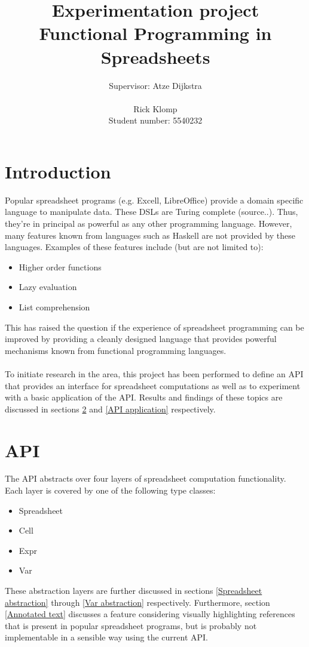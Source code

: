 \documentclass[10pt,a4paper]{article}
\begin{document}
\author{Supervisor: Atze Dijkstra\\\\Rick Klomp\\Student number: 5540232}
\title{Experimentation project\\Functional Programming in Spreadsheets}
\maketitle
\pagebreak

\section{Introduction}
Popular spreadsheet programs (e.g. Excell, LibreOffice) provide a
domain specific language to manipulate data. These DSLs are Turing complete (source..). Thus,
they're in principal as powerful as any other programming language.
However, many features known from languages such as Haskell are not provided by these languages.
Examples of these features include (but are not limited to):
\begin{itemize}
\item Higher order functions
\item Lazy evaluation
\item List comprehension
\end{itemize}
This has raised the question if the experience of spreadsheet programming can be improved by
providing a cleanly designed language that provides powerful mechanisms known from functional
programming languages.
\\\\
To initiate research in the area, this project has been performed to define an API that provides
an interface for spreadsheet computations as well as to experiment with a basic application of
the API. Results and findings of these topics are discussed in sections \ref{API} and
\ref{API application} respectively.

\section{API}
\label{API}
The API abstracts over four layers of spreadsheet computation functionality.
Each layer is covered by one of the following type classes:
\begin{itemize}
\item Spreadsheet
\item Cell
\item Expr
\item Var
\end{itemize}
These abstraction layers are further discussed in sections \ref{Spreadsheet abstraction} through
\ref{Var abstraction} respectively. Furthermore, section \ref{Annotated text} discusses a feature
considering visually highlighting references that is present in popular spreadsheet programs,
but is probably not implementable in a sensible way using the current API.
\end{document}

